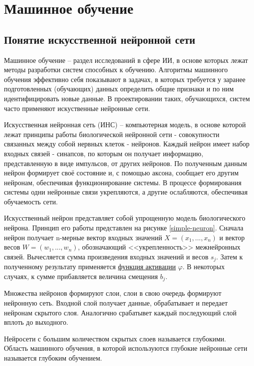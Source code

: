 \section{Машинное обучение} \label{ML}

\subsection{Понятие искусственной нейронной сети}

Машинное обучение – раздел исследований в сфере ИИ, в основе которых лежат методы разработки систем способных к обучению. Алгоритмы машинного обучения эффективно себя показывают в задачах, в которых требуется у заранее подготовленных (обучающих) данных определить общие признаки и по ним идентифицировать новые данные. В проектировании таких, обучающихся, систем часто применяют искуственные нейронные сети. 

Искусственная нейронная сеть (ИНС) – компьютерная модель, в основе которой лежат принципы работы биологической нейронной сети - совокупности связанных между собой нервных клеток - нейронов. Каждый нейрон имеет набор входных связей - синапсов, по которым он получает информацию, представленную в виде импульсов, от других нейронов. По полученным данным нейрон формирует своё состояние и, с помощью аксона, сообщает его другим нейронам, обеспечивая функционирование системы. В процессе формирования системы одни нейронные связи укрепляются, а другие ослабляются, обеспечивая обучаемость сети.

Искусственный нейрон представляет собой упрощенную модель биологического нейрона. Принцип его работы представлен на рисунке \ref{simple-neuron}. Сначала нейрон получает n-мерные вектор входных значений $X=(x_{1},...,x_{n})$ и вектор весов $W=(w_{1},...,w_{n})$, обозначающий <<укрепленность>> межнейронных связей. Вычесляется сумма произведения входных значений и весов $s_j$. Затем к полученному результату применяется \hyperref[sec:activation]{функция активации} $\varphi$. В некоторых случаях, к сумме прибавляется величина смещения $b_j$.


Множества нейронов формируют слои, слои в свою очередь формируют нейронную сеть. Входной слой получает данные, обрабатывает и передает нейронам скрытого слоя. Аналогично срабатывет каждый последующий слой вплоть до выходного. 


Нейросети с большим количеством скрытых слоев называется глубокими. Область машинного обучения, в которой используются глубокие нейронные сети называется глубоким обучением.     

